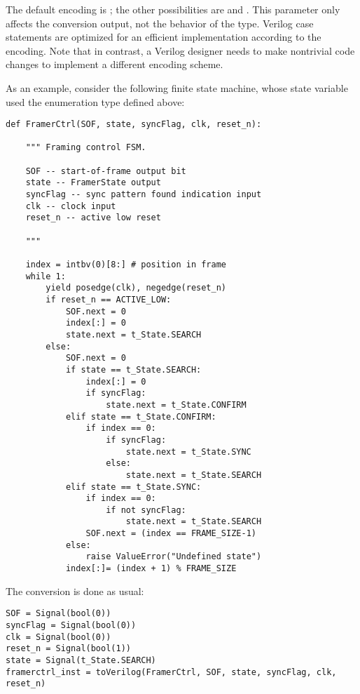 \documentclass{howto}
\begin{document}
The default encoding is ; the other possibilities are  and
. This parameter only affects the conversion output, not the
behavior of the type. Verilog case statements are optimized for an
efficient implementation according to the encoding. Note that in
contrast, a Verilog designer needs to make nontrivial code changes to
implement a different encoding scheme.

As an example, consider the following finite state machine, whose
state variable used the enumeration type defined above:

\begin{verbatim}
def FramerCtrl(SOF, state, syncFlag, clk, reset_n):
    
    """ Framing control FSM.

    SOF -- start-of-frame output bit
    state -- FramerState output
    syncFlag -- sync pattern found indication input
    clk -- clock input
    reset_n -- active low reset
    
    """
    
    index = intbv(0)[8:] # position in frame
    while 1:
        yield posedge(clk), negedge(reset_n)
        if reset_n == ACTIVE_LOW:
            SOF.next = 0
            index[:] = 0
            state.next = t_State.SEARCH
        else:
            SOF.next = 0
            if state == t_State.SEARCH:
                index[:] = 0
                if syncFlag:
                    state.next = t_State.CONFIRM
            elif state == t_State.CONFIRM:
                if index == 0:
                    if syncFlag:
                        state.next = t_State.SYNC
                    else:
                        state.next = t_State.SEARCH
            elif state == t_State.SYNC:
                if index == 0:
                    if not syncFlag:
                        state.next = t_State.SEARCH
                SOF.next = (index == FRAME_SIZE-1)
            else:
                raise ValueError("Undefined state")
            index[:]= (index + 1) % FRAME_SIZE

\end{verbatim}

The conversion is done as usual:

\begin{verbatim}
SOF = Signal(bool(0))
syncFlag = Signal(bool(0))
clk = Signal(bool(0))
reset_n = Signal(bool(1))
state = Signal(t_State.SEARCH)
framerctrl_inst = toVerilog(FramerCtrl, SOF, state, syncFlag, clk, reset_n)
\end{verbatim}
\end{document}
